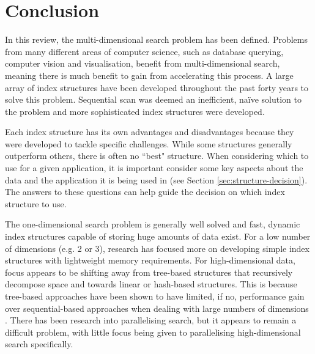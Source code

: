 \section{Conclusion}

In this review, the multi-dimensional search problem has been defined. Problems from many different areas of computer science, such as database querying, computer vision and visualisation, benefit from multi-dimensional search, meaning there is much benefit to gain from accelerating this process. A large array of index structures have been developed throughout the past forty years to solve this problem. Sequential scan was deemed an inefficient, na\"{i}ve solution to the problem and more sophisticated index structures were developed.

Each index structure has its own advantages and disadvantages because they were developed to tackle specific challenges. While some structures generally outperform others, there is often no ``best" structure. When considering which to use for a given application, it is important consider some key aspects about the data and the application it is being used in (see Section \ref{sec:structure-decision}). The answers to these questions can help guide the decision on which index structure to use.

The one-dimensional search problem is generally well solved and fast, dynamic index structures capable of storing huge amounts of data exist. For a low number of dimensions (e.g. 2 or 3), research has focused more on developing simple index structures with lightweight memory requirements. For high-dimensional data, focus appears to be shifting away from tree-based structures that recursively decompose space and towards linear or hash-based structures. This is because tree-based approaches have been shown to have limited, if no, performance gain over sequential-based approaches when dealing with large numbers of dimensions \cite{md-structures-samet}. There has been research into parallelising search, but it appears to remain a difficult problem, with little focus being given to parallelising high-dimensional search specifically.
